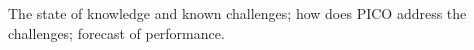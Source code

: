 \documentclass[PICOReport.tex]{subfiles}
\begin{document}
The state of knowledge and known challenges; how does PICO address the challenges; forecast of performance. 
\end{document}
